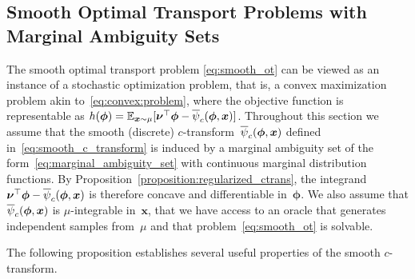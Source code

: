 \documentclass[11pt, a4paper, oneside, reqno]{article}
\begin{document}
	\subsection{Smooth Optimal Transport Problems with Marginal Ambiguity Sets}
	\label{section:ASGD-OT}
	The smooth optimal transport problem \eqref{eq:smooth_ot} can be viewed as an instance of a stochastic optimization problem, that is, a convex maximization problem akin to~\eqref{eq:convex:problem}, where the objective function is representable as $h(\bm \phi) = \mathbb{E}_{\boldsymbol x \sim \mu} [ \boldsymbol \nu^\top \boldsymbol \phi - \overline\psi_c(\boldsymbol \phi, \boldsymbol x)]$. Throughout this section we assume that the smooth (discrete) $c$-transform~$\overline\psi_c(\boldsymbol \phi, \boldsymbol x)$ defined in~\eqref{eq:smooth_c_transform} is induced by a marginal ambiguity set of the form~\eqref{eq:marginal_ambiguity_set} with continuous marginal distribution functions. By Proposition~\ref{proposition:regularized_ctrans}, the integrand $\boldsymbol \nu^\top \boldsymbol \phi - \overline\psi_c(\boldsymbol \phi, \boldsymbol x)$ is therefore concave and differentiable in~$\bm \phi$. We also assume that $\overline\psi_c(\boldsymbol \phi, \boldsymbol x)$ is $\mu$-integrable in~$\bm x$, that we have access to an oracle that generates independent samples from~$\mu$ and that problem~\eqref{eq:smooth_ot} is solvable. 
	
	The following proposition establishes several useful properties of the smooth $c$-transform.
	
\end{document}

